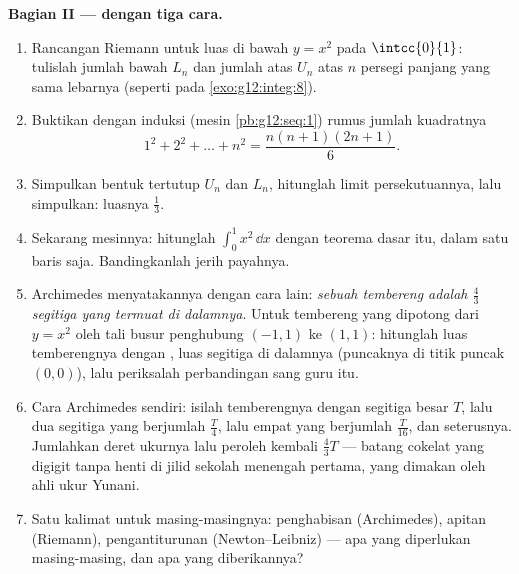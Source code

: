 \begin{problem}
\medskip
\noindent\textbf{Bagian II ---  dengan tiga cara.}
\begin{enumerate}[resume]
  \item Rancangan Riemann untuk luas di bawah $y = x^2$ pada
        $\intcc{0}{1}$: tulislah jumlah bawah $L_n$ dan jumlah
        atas $U_n$ atas $n$ persegi panjang yang sama lebarnya (seperti pada
        \cref{exo:g12:integ:8}).
  \item Buktikan dengan induksi (mesin \cref{pb:g12:seq:1}) rumus
        jumlah kuadratnya
        \[
        1^2 + 2^2 + \dots + n^2 = \frac{n(n+1)(2n+1)}{6} .
        \]
  \item Simpulkan bentuk tertutup $U_n$ dan $L_n$, hitunglah
        limit persekutuannya, lalu simpulkan: luasnya $\frac13$.
  \item Sekarang mesinnya: hitunglah
        $\int_0^1 x^2\,\dd x$ dengan teorema dasar itu, dalam
        satu baris saja. Bandingkanlah jerih payahnya.
  \item Archimedes menyatakannya dengan cara lain: \emph{sebuah tembereng
         adalah $\frac43$ segitiga yang termuat di dalamnya}. Untuk
        tembereng yang dipotong dari $y = x^2$ oleh tali busur penghubung
        $(-1, 1)$ ke $(1, 1)$: hitunglah luas temberengnya dengan
        , luas segitiga di dalamnya (puncaknya di
        titik puncak $(0, 0)$), lalu periksalah perbandingan sang guru itu.
  \item Cara Archimedes sendiri: isilah temberengnya dengan segitiga
        besar $T$, lalu dua segitiga yang berjumlah
        $\frac T4$, lalu empat yang berjumlah $\frac{T}{16}$, dan
        seterusnya. Jumlahkan deret ukurnya lalu peroleh kembali
        $\frac43 T$ --- batang cokelat yang digigit tanpa henti di
        jilid sekolah menengah pertama, yang dimakan oleh ahli ukur Yunani.
  \item Satu kalimat untuk masing-masingnya: penghabisan (Archimedes), apitan
        (Riemann), pengantiturunan (Newton--Leibniz) ---
        apa yang diperlukan masing-masing, dan apa yang diberikannya?
\end{enumerate}


\end{problem}
